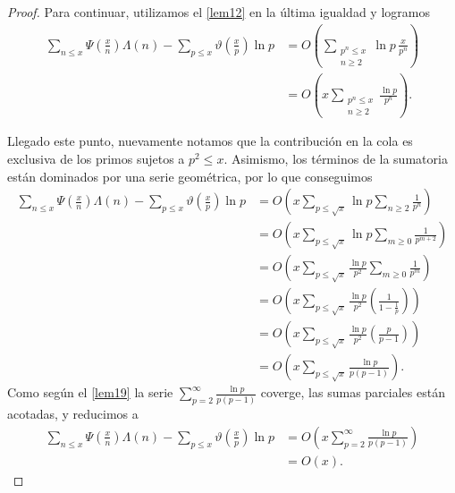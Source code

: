\begin{proof}
Para continuar, utilizamos el \cref{lem12} en la \'ultima igualdad y logramos 
\begin{align}
\sum_{n \leq x} \Psi\left(\frac{x}{n}\right)\Lambda(n) - \sum_{p \leq x} \vartheta\left(\frac{x}{p}\right)\ln p
&= O\left(\sum_{\substack{p^n \leq x \\ n \geq 2}} \ln p \, \frac{x}{p^n}\right) \\
&= O\left(x\sum_{\substack{p^n \leq x \\ n \geq 2}} \frac{\ln p}{p^n}\right).
\end{align}

Llegado este punto, nuevamente notamos que la contribuci\'on en la cola es exclusiva de los primos sujetos a $p^2 \le x$. 
Asimismo, los t\'erminos de la sumatoria est\'an dominados por una serie geom\'etrica, 
por lo que conseguimos 
\begin{align}
\sum_{n \leq x} \Psi\left(\frac{x}{n}\right)\Lambda(n) - \sum_{p \leq x} \vartheta\left(\frac{x}{p}\right)\ln p
&= O\left(x \sum_{p \leq \sqrt{x}} \ln p \sum_{n \geq 2} \frac{1}{p^n}\right) \\
%
&= O\left(x \sum_{p \leq \sqrt{x}} \ln p \sum_{m \geq 0} \frac{1}{p^{m + 2}}\right) \\
&= O\left(x \sum_{p \leq \sqrt{x}} \frac{\ln p}{p^2} \sum_{m \geq 0} \frac{1}{p^m}\right) \\
&= O\left(x \sum_{p \leq \sqrt{x}} \frac{\ln p}{p^2} \left(\frac{1}{1 - \frac{1}{p}}\right)\right) \\
&= O\left(x \sum_{p \leq \sqrt{x}} \frac{\ln p}{p^2} \left(\frac{p}{p - 1}\right)\right) \\
&= O\left(x \sum_{p \leq \sqrt{x}} \frac{\ln p}{p (p - 1)}\right).
\end{align}
Como seg\'un el \cref{lem19} la serie $\displaystyle{\sum_{p = 2}^{\infty} \frac{\ln p}{p (p - 1)}}$ coverge, 
las sumas parciales est\'an acotadas, y reducimos a 
\begin{align}
\sum_{n \leq x} \Psi\left(\frac{x}{n}\right)\Lambda(n) - \sum_{p \leq x} \vartheta\left(\frac{x}{p}\right)\ln p
&= O\left(x \sum_{p = 2}^\infty \frac{\ln p}{p (p - 1)}\right) \\
&= O(x).
\end{align}


\end{proof}
